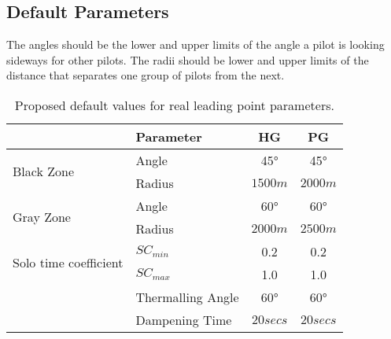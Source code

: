 \documentclass[gap.tex]{subfiles}
\begin{document}
\subsection{Default Parameters}
The angles should be the lower and upper limits of the angle a pilot is looking
sideways for other pilots.  The radii should be lower and upper limits of the
distance that separates one group of pilots from the next.

\begin{table}[!ht]
    \begin{tabularx}{\textwidth}{|l|X|c|c|}
    \hline
        & \textbf{Parameter}
        & \textbf{HG}
        & \textbf{PG}
        \\
    \hline
        \multirow{2}{*}{Black Zone}
        & Angle
        & 45°
        & 45°
        \\
    \cline{2-4}
        & Radius
        & $1500 m$
        & $2000 m$
        \\
    \hline
        \multirow{2}{*}{Gray Zone}
        & Angle
        & 60°
        & 60°
        \\
    \cline{2-4}
        & Radius
        & $2000 m$
        & $2500 m$
        \\
    \hline
        \multirow{2}{*}{Solo time coefficient}
        & $SC_{min}$
        & 0.2
        & 0.2
        \\
    \cline{2-4}
        & $SC_{max}$
        & 1.0
        & 1.0
        \\
    \hline
        \multirow{3}{*}{}
        & Thermalling Angle
        & 60°
        & 60°
        \\
    \cline{2-4}
        & Dampening Time
        & $20 secs$
        & $20 secs$
        \\
    \hline
    \end{tabularx}
    \caption{Proposed default values for real leading point parameters.}
    \label{tab:gap-defaults}
\end{table}
\end{document}

